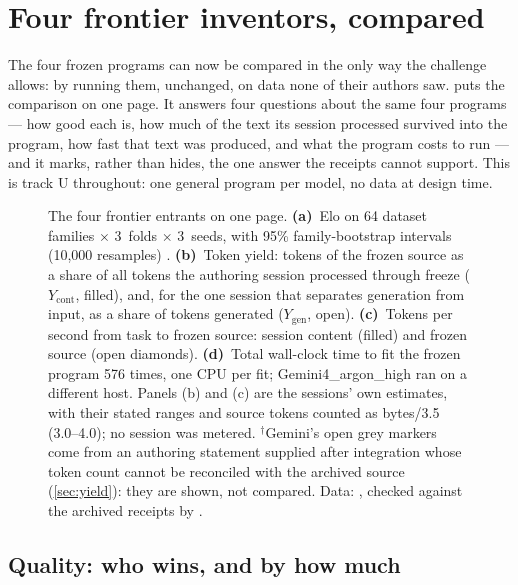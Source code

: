 \section{Four frontier inventors, compared}
\label{sec:frontier}

The four frozen programs can now be compared in the only way the challenge allows: by running them,
unchanged, on data none of their authors saw.  puts the comparison on one page. It
answers four questions about the same four programs --- how good each is, how much of the text its
session processed survived into the program, how fast that text was produced, and what the program
costs to run --- and it marks, rather than hides, the one answer the receipts cannot support. This
is track U throughout: one general program per model, no data at design time.

\begin{figure}[t]
\centering

\caption{The four frontier entrants on one page. \textbf{(a)}~Elo on 64 dataset families $\times$
3~folds $\times$ 3~seeds, with 95\% family-bootstrap intervals (10,000 resamples) \pre.
\textbf{(b)}~Token yield: tokens of the frozen source as a share of all tokens the authoring session
processed through freeze ($Y_{\mathrm{cont}}$, filled), and, for the one session that separates
generation from input, as a share of tokens generated ($Y_{\mathrm{gen}}$, open).
\textbf{(c)}~Tokens per second from task to frozen source: session content (filled) and frozen
source (open diamonds). \textbf{(d)}~Total wall-clock time to fit the frozen program 576 times, one
CPU per fit; Gemini4\_argon\_high ran on a different host. Panels (b) and (c) are the sessions' own
estimates, with their stated ranges and source tokens counted as bytes/3.5 (3.0--4.0); no session
was metered. $^\dagger$Gemini's open grey markers come from an authoring statement supplied after
integration whose token count cannot be reconciled with the archived source (\cref{sec:yield}):
they are shown, not compared. Data:
, checked against the archived receipts by .}
\label{fig:frontier}
\end{figure}

\subsection{Quality: who wins, and by how much}
\label{sec:u64}

